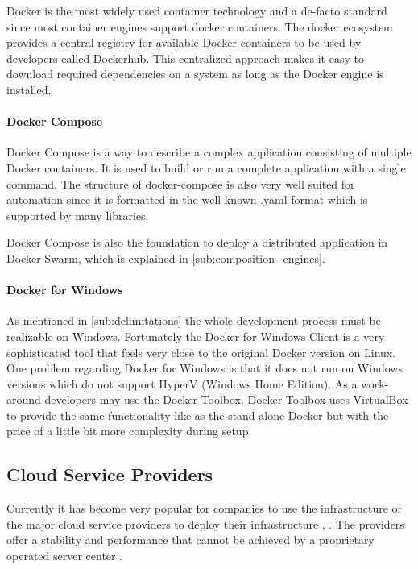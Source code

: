 Docker is the most widely used container technology and a de-facto standard
since most container engines support docker containers. The docker ecosystem
provides a central registry for available Docker containers to be used by
developers called Dockerhub. This centralized approach makes it easy to download
required dependencies on a system as long as the Docker engine is installed.

\paragraph{Docker Compose}

Docker Compose is a way to describe a complex application consisting of multiple
Docker containers. It is used to build or run a complete \ms{} application with
a single command. The structure of docker-compose is also very well suited for
automation since it is formatted in the well known .yaml format which is
supported by many libraries.

Docker Compose is also the foundation to deploy a distributed application in
Docker Swarm, which is explained in \autoref{sub:composition_engines}.

\paragraph{Docker for Windows}

As mentioned in \autoref{sub:delimitations} the whole \og{} development process
must be realizable on Windows. Fortunately the Docker for Windows Client is a
very sophisticated tool that feels very close to the original Docker version on
Linux. One problem regarding Docker for Windows is that it does not run on
Windows versions which do not support HyperV (Windows Home Edition). As a
work-around developers may use the Docker Toolbox. Docker Toolbox uses
VirtualBox to provide the same functionality like as the stand alone Docker but
with the price of a little bit more complexity during setup.

\subsection{Cloud Service Providers}

Currently it has become very popular for companies to use the infrastructure of
the major cloud service providers to deploy their infrastructure
\cite{roberts2016aws}, \cite{pronschinske2015turbine}. The providers offer a
stability and performance that cannot be achieved by a proprietary operated
server center \cite{gai2012towards}.

